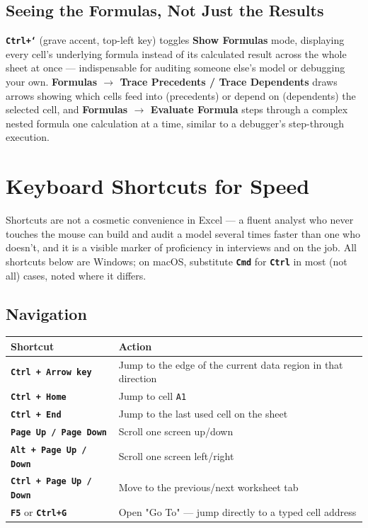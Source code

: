 \documentclass[11pt,a4paper]{article}
\newcommand{\key}[1]{\texttt{\colorbox{black!8}{\textbf{#1}}}}
\begin{document}
\subsection{Seeing the Formulas, Not Just the Results}

\key{Ctrl+`} (grave accent, top-left key) toggles \textbf{Show Formulas} mode, displaying every cell's underlying formula instead of its calculated result across the whole sheet at once --- indispensable for auditing someone else's model or debugging your own. \textbf{Formulas $\rightarrow$ Trace Precedents / Trace Dependents} draws arrows showing which cells feed into (precedents) or depend on (dependents) the selected cell, and \textbf{Formulas $\rightarrow$ Evaluate Formula} steps through a complex nested formula one calculation at a time, similar to a debugger's step-through execution.

\section{Keyboard Shortcuts for Speed}

Shortcuts are not a cosmetic convenience in Excel --- a fluent analyst who never touches the mouse can build and audit a model several times faster than one who doesn't, and it is a visible marker of proficiency in interviews and on the job. All shortcuts below are Windows; on macOS, substitute \key{Cmd} for \key{Ctrl} in most (not all) cases, noted where it differs.

\subsection{Navigation}

\begin{center}
\begin{tabular}{@{}p{5.4cm}p{6.6cm}@{}}
\toprule
\textbf{Shortcut} & \textbf{Action} \\
\midrule
\key{Ctrl + Arrow key} & Jump to the edge of the current data region in that direction \\
\key{Ctrl + Home} & Jump to cell \texttt{A1} \\
\key{Ctrl + End} & Jump to the last used cell on the sheet \\
\key{Page Up / Page Down} & Scroll one screen up/down \\
\key{Alt + Page Up / Down} & Scroll one screen left/right \\
\key{Ctrl + Page Up / Down} & Move to the previous/next worksheet tab \\
\key{F5} or \key{Ctrl+G} & Open "Go To" --- jump directly to a typed cell address \\
\bottomrule
\end{tabular}
\end{center}
\end{document}
